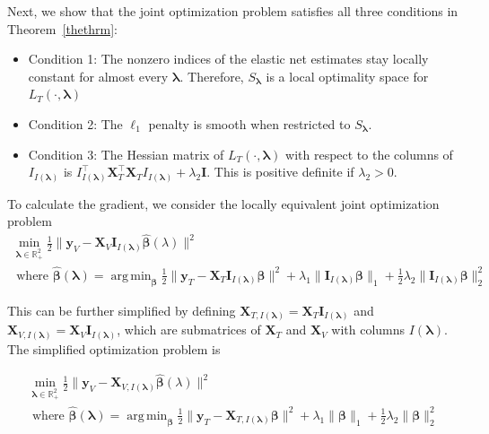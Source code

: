 \documentclass[10pt,letterpaper]{article}
\DeclareMathOperator*{\argmin}{arg\,min}
\begin{document}
Next, we show that the joint optimization problem satisfies all three conditions in Theorem~\ref{thethrm}:
\begin{itemize}
\item[] Condition 1: The nonzero indices of the elastic net estimates stay locally constant for almost every $\boldsymbol{\lambda}$. Therefore, $S_{\boldsymbol{\lambda}}$ is a local optimality space for $L_T(\cdot, \boldsymbol{\lambda})$ \hfill {}
\item[] Condition 2: The $\ell_1$ penalty is smooth when restricted to $S_{\boldsymbol{\lambda}}$.\hfill {}
\item[] Condition 3: The Hessian matrix of $L_T(\cdot, \boldsymbol{\lambda})$ with respect to the columns of $I_{I(\boldsymbol \lambda)}$ is $I_{I(\boldsymbol \lambda)}^\top \boldsymbol{X}_{T}^\top \boldsymbol{X}_{T} I_{I(\boldsymbol \lambda)} + \lambda_2 \boldsymbol{I}$. This is positive definite if $\lambda_2 > 0$. \hfill {}
\end{itemize}

To calculate the gradient, we consider the locally equivalent joint optimization problem
\begin{equation}
\begin{array}{c}
\min_{\boldsymbol{\lambda} \in \mathbb{R}^2_{+}} \frac{1}{2} \| \boldsymbol{y}_V - \boldsymbol{X}_V \boldsymbol{I}_{I(\boldsymbol \lambda)} \hat{\boldsymbol{\beta}} (\lambda) \| ^2 \\
\text{ where }
\hat{\boldsymbol{\beta}} (\boldsymbol{\lambda}) = \argmin_{\boldsymbol{\beta}} \frac{1}{2} \| \boldsymbol{y}_T - \boldsymbol{X}_T \boldsymbol{I}_{I(\boldsymbol \lambda)} \boldsymbol{\beta} \| ^2
+ \lambda_1 \| \boldsymbol{I}_{I(\boldsymbol \lambda)} \boldsymbol{\beta} \|_1
+ \frac{1}{2}\lambda_2 \| \boldsymbol{I}_{I(\boldsymbol \lambda)} \boldsymbol{\beta} \|_2^2
\end{array}
\end{equation}

This can be further simplified by defining $\boldsymbol{X}_{T, I(\boldsymbol\lambda)} = \boldsymbol{X}_T \boldsymbol{I}_{I(\boldsymbol \lambda)}$ and $\boldsymbol{X}_{V, I(\boldsymbol\lambda)}  = \boldsymbol{X}_V \boldsymbol{I}_{I(\boldsymbol \lambda)}$, which are submatrices of $\boldsymbol{X}_T$ and $\boldsymbol{X}_V$ with columns $I(\boldsymbol \lambda)$. The simplified optimization problem is

\begin{equation}
\begin{array}{c}
\min_{\boldsymbol{\lambda} \in \mathbb{R}^2_{+}} \frac{1}{2} \| \boldsymbol{y}_V - \boldsymbol{X}_{V, I(\boldsymbol \lambda)} \hat{\boldsymbol{\beta}} (\lambda) \| ^2 \\
\text{ where }
\hat{\boldsymbol{\beta}} (\boldsymbol{\lambda}) = \argmin_{\boldsymbol \beta} \frac{1}{2} \| \boldsymbol{y}_T - \boldsymbol{X}_{T, I(\boldsymbol \lambda)} \boldsymbol \beta \| ^2
+ \lambda_1 \| \boldsymbol \beta \|_1
+ \frac{1}{2}\lambda_2 \| \boldsymbol \beta \|_2^2
\end{array}
\end{equation}
\end{document}
